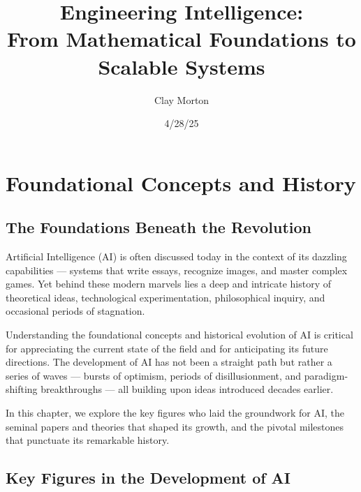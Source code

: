 \documentclass[openany]{book}
\title{Engineering Intelligence: \\ From Mathematical Foundations to Scalable Systems}
\author{Clay Morton}
\date{4/28/25}
\begin{document}
\maketitle

\begingroup
\let\cleardoublepage\relax
\tableofcontents
\endgroup

\chapter{Foundational Concepts and History}

\section{The Foundations Beneath the Revolution}

Artificial Intelligence (AI) is often discussed today in the context of its 
dazzling capabilities — systems that write essays, recognize images, and master 
complex games. Yet behind these modern marvels lies a deep and intricate history 
of theoretical ideas, technological experimentation, philosophical inquiry, and 
occasional periods of stagnation.

Understanding the foundational concepts and historical evolution of AI is 
critical for appreciating the current state of the field and for anticipating 
its future directions. The development of AI has not been a straight path but 
rather a series of waves — bursts of optimism, periods of disillusionment, and 
paradigm-shifting breakthroughs — all building upon ideas introduced decades 
earlier.

In this chapter, we explore the key figures who laid the groundwork for AI, the
seminal papers and theories that shaped its growth, and the pivotal milestones 
that punctuate its remarkable history.

\section{Key Figures in the Development of AI}
\end{document}

